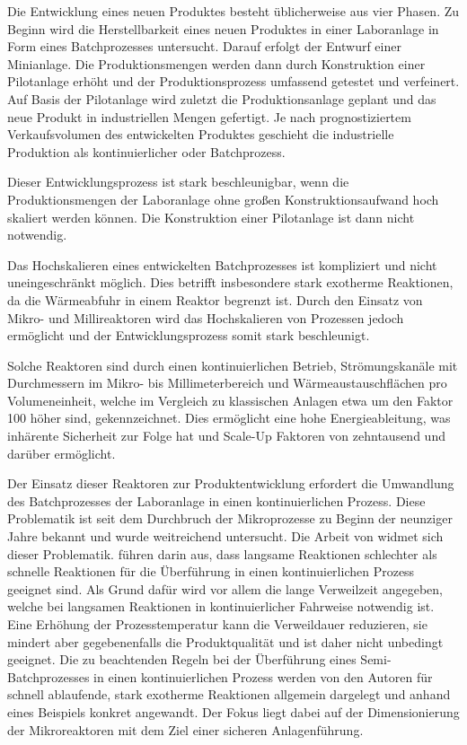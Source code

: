 Die Entwicklung eines neuen Produktes besteht \"ublicherweise aus vier Phasen. Zu Beginn wird die Herstellbarkeit eines neuen Produktes in einer Laboranlage in Form eines Batchprozesses untersucht. Darauf erfolgt der Entwurf einer Minianlage. Die Produktionsmengen werden dann durch Konstruktion einer Pilotanlage erh\"oht und der Produktionsprozess umfassend getestet und verfeinert. Auf Basis der Pilotanlage wird zuletzt die Produktionsanlage geplant und das neue Produkt in industriellen Mengen gefertigt. Je nach prognostiziertem Verkaufsvolumen des entwickelten Produktes geschieht die industrielle Produktion als kontinuierlicher oder Batchprozess. \cite{Grundemann_2012}

Dieser  Entwicklungsprozess ist stark beschleunigbar, wenn die Produktionsmengen der Laboranlage ohne gro\ss{}en Konstruktionsaufwand hoch skaliert werden k\"onnen. Die Konstruktion einer Pilotanlage ist dann nicht notwendig.

Das Hochskalieren eines entwickelten Batchprozesses ist kompliziert und nicht uneingeschr\"ankt m\"oglich. Dies betrifft insbesondere stark exotherme Reaktionen, da die W\"armeabfuhr in einem Reaktor begrenzt ist. \cite{Brodhagen_2012} \newline
Durch den Einsatz von Mikro- und Millireaktoren wird das Hochskalieren von Prozessen jedoch erm\"oglicht und der Entwicklungsprozess somit stark beschleunigt. \cite{Grundemann_2012, Brodhagen_2012, Helling_2012, Kockmann_2012, Hessel_2012}

Solche Reaktoren sind durch einen kontinuierlichen Betrieb, Str\"omungskan\"ale mit Durchmessern im Mikro- bis Millimeterbereich und W\"armeaustauschfl\"achen pro Volumeneinheit, welche im Vergleich zu klassischen Anlagen etwa um den Faktor 100 h\"oher sind, gekennzeichnet. Dies erm\"oglicht eine hohe Energieableitung, was inh\"arente Sicherheit zur Folge hat und Scale-Up Faktoren von zehntausend und dar\"uber erm\"oglicht. \cite{Brodhagen_2012, Kockmann_2012a,Behr_2012}

Der Einsatz dieser Reaktoren zur Produktentwicklung erfordert die Umwandlung des Batchprozesses der Laboranlage in einen kontinuierlichen Prozess. Diese Problematik ist seit dem Durchbruch der Mikroprozesse zu Beginn der neunziger Jahre bekannt und wurde weitreichend untersucht. \cite{Helling_2012} Die Arbeit  von \citeauthor{Hugo_2009} widmet sich dieser Problematik. \citeauthor{Hugo_2009} f\"uhren darin aus, dass langsame Reaktionen schlechter als schnelle Reaktionen f\"ur die \"Uberf\"uhrung in einen kontinuierlichen Prozess geeignet sind. Als Grund daf\"ur wird vor allem die lange Verweilzeit angegeben, welche bei langsamen Reaktionen in kontinuierlicher Fahrweise notwendig ist. Eine Erh\"ohung der Prozesstemperatur kann die Verweildauer reduzieren, sie mindert aber gegebenenfalls die Produktqualit\"at und ist daher nicht unbedingt geeignet. Die zu beachtenden Regeln bei der \"Uberf\"uhrung eines Semi-Batchprozesses in einen kontinuierlichen Prozess werden von den Autoren f\"ur  schnell ablaufende, stark exotherme Reaktionen allgemein dargelegt und anhand eines Beispiels konkret angewandt. Der Fokus liegt dabei auf der Dimensionierung der Mikroreaktoren mit dem Ziel einer sicheren Anlagenf\"uhrung.\cite{Hugo_2009}

